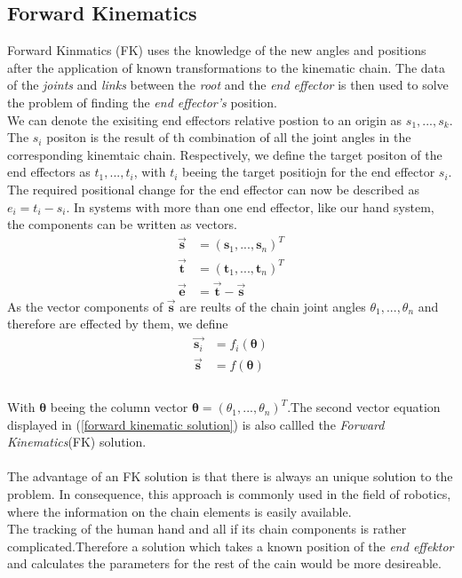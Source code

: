  \subsection{Forward Kinematics}Forward
 \label{Forward Kinematics}  Kinmatics (FK) uses the knowledge of the new angles and positions after the application of known transformations to the kinematic chain. The data of the \textit{joints} and \textit{links} between the \textit{root} and the \textit{end effector} is then used to solve the problem of finding the \textit{end effector's} position.\\
We can denote the exisiting end effectors relative postion to an origin as $ s_{1},...,s_{k}$. The $s_{i}$ positon is the result of th combination of all the joint angles in the corresponding kinemtaic chain. Respectively, we define the target positon of the end effectors as $t_{1},...,t_{i}$, with $t_{i}$ beeing the target positiojn for the end effector $s_{i}$. The required positional change for the end effector can now be described as $e_{i}=t_{i}-s_{i}$. In systems with more than one end effector, like our hand system, the components can be written as vectors.
\begin{equation}
\label{fk components}
\begin{split}
\vec{\textbf{s}}&=(\textbf{s}_{1},...,\textbf{s}_{n})^{T}\\
\vec{\textbf{t}}&=(\textbf{t}_{1},...,\textbf{t}_{n})^{T}\\
\vec{\textbf{e}}&= \vec{\textbf{t}}-\vec{\textbf{s}}
\end{split}
\end{equation}
As the vector components of $\vec{\textbf{s}}$ are reults of the chain joint angles $\theta_{1},...,\theta_{n}$ and therefore are effected by them, we define 
\begin{equation}
\label{forward kinematic solution}
\begin{split}
\vec{\textbf{s}_{i}}&=f_{i}(\pmb{\theta})\\
\vec{\textbf{s}}&=f(\pmb{\theta})\\
\end{split}
\end{equation}
\\With $\pmb{\theta}$ beeing the column vector $\pmb{\theta}=(\theta_{1},...,\theta_{n})^{T}$.The second vector equation displayed in (\ref{forward kinematic solution}) is also callled the \textit{Forward Kinematics}(FK) solution.\\
\\The advantage of an FK solution is that there is always an unique solution to the problem. In consequence, this approach is commonly used in the field of robotics, where the information on the chain elements is easily available.\\
The tracking of the human hand and all if its chain components is rather complicated.Therefore a solution which takes a known position of the \textit{end effektor} and calculates the parameters for the rest of the cain would be more desireable.\\

